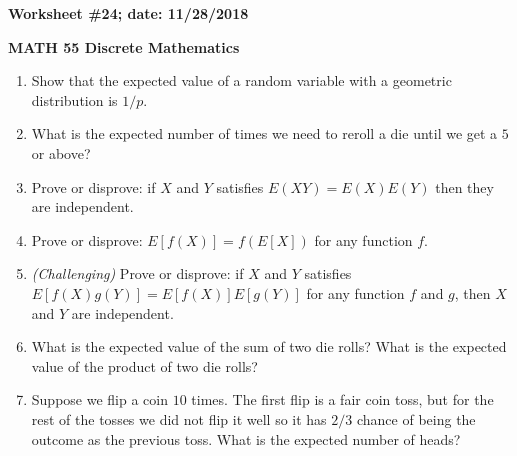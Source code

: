 \documentclass{article}
\begin{document}
{\bf Worksheet \#24; date: 11/28/2018}

{\bf MATH 55 Discrete Mathematics}

\begin{enumerate}
\item Show that the expected value of a random variable with a geometric distribution is $1/p$.

\item What is the expected number of times we need to reroll a die until we get a $5$ or above?

\item Prove or disprove: if $X$ and $Y$ satisfies $E(XY) = E(X) E(Y)$ then they are independent.

\item Prove or disprove: $E[f(X)] = f(E[X])$ for any function $f$.

\item {\em (Challenging)} Prove or disprove: if $X$ and $Y$ satisfies $E[f(X) g(Y)] = E[f(X)] E[g(Y)]$ for any function $f$ and $g$, then $X$ and $Y$ are independent.

\item What is the expected value of the sum of two die rolls? What is the expected value of the product of two die rolls?

\item Suppose we flip a coin $10$ times. The first flip is a fair coin toss, but for the rest of the tosses we did not flip it well so it has $2/3$ chance of being the outcome as the previous toss. What is the expected number of heads?
\end{enumerate}
\end{document}
